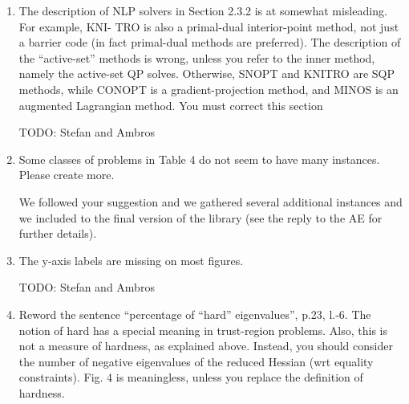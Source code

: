 \documentclass[11pt]{article}
\newcommand{\rep}[1]{{\textcolor{acblue}{#1}}}
\newcommand{\leo}[1]{{\color{red}#1}}
\begin{document}
{\begin{enumerate}
\rep{We added a comment about this issue in Section 2.1 
}


\item The description of NLP solvers in Section 2.3.2 is at somewhat misleading. For example, KNI-
TRO is also a primal-dual interior-point method, not just a barrier code (in fact primal-dual
methods are preferred). The description of the “active-set” methods is wrong, unless you refer
to the inner method, namely the active-set QP solves. Otherwise, SNOPT and KNITRO are
SQP methods, while CONOPT is a gradient-projection method, and MINOS is an augmented
Lagrangian method. You must correct this section

\rep{TODO: Stefan and Ambros
}


\item Some classes of problems in Table 4 do not seem to have many instances. Please create more.

\rep{We followed your suggestion and we gathered several additional instances and we included to the final version of the library (see the reply to the AE for further details).}

\item The y-axis labels are missing on most figures.

\rep{
TODO: Stefan and Ambros
}


\item Reword the sentence ``percentage of ``hard'' eigenvalues'', p.23, l.-6. The notion of hard has a
special meaning in trust-region problems. Also, this is not a measure of hardness, as explained
above. Instead, you should consider the number of negative eigenvalues of the reduced Hessian
(wrt equality constraints). Fig. 4 is meaningless, unless you replace the definition of hardness.


\end{enumerate}}
\end{document}
